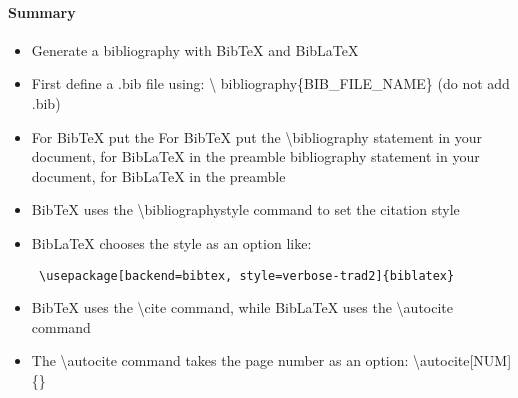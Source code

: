     \paragraph{Summary}
    \begin{itemize} %
      \item Generate a bibliography with BibTeX and BibLaTeX
      \item First define a .bib 
        file using: \textbackslash 
        bibliography\{BIB\_FILE\_NAME\} 
        (do not add .bib)
      \item For BibTeX put the For BibTeX put the \textbackslash bibliography statement
         in your document, for BibLaTeX in the preamble bibliography 
         statement in your document, for BibLaTeX in the preamble
      \item BibTeX uses the \textbackslash bibliographystyle command to set the citation style
      \item BibLaTeX chooses the style as an option like: 
        \begin{verbatim} \usepackage[backend=bibtex, style=verbose-trad2]{biblatex} \end{verbatim} 
      \item BibTeX uses the \textbackslash cite command, while BibLaTeX uses the \textbackslash autocite command
      \item The \textbackslash autocite command takes the page number as an option: \textbackslash autocite[NUM]\{\}
    \end{itemize} 

  \maketitle
  \newpage